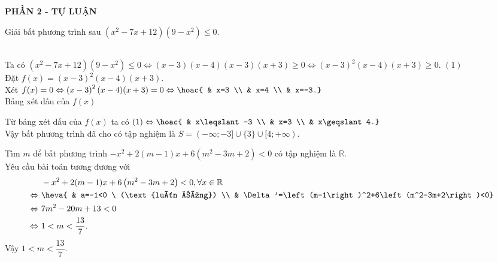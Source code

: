 \begin{center}
	\textbf{PHẦN 2 - TỰ LUẬN}
\end{center}
\begin{bt}%
Giải bất phương trình sau $\left(x^2-7x+12\right)\left(9-x^2\right)\leqslant0$.
\loigiai
{\\
Ta có $\left(x^2-7x+12\right)\left(9-x^2\right)\leqslant0 \Leftrightarrow (x-3)(x-4)(x-3)(x+3)\geqslant0 \Leftrightarrow \left(x-3\right)^2(x-4)(x+3)\geqslant0$. \hfill $(1)$ \\
Đặt $f(x)=\left(x-3\right)^2(x-4)(x+3)$. \\
Xét $f(x)=0 \Leftrightarrow \left(x-3\right)^2(x-4)(x+3)=0 \Leftrightarrow \hoac{ & x=3 \\ & x=4 \\ & x=-3.}$ \\
Bảng xét dấu của $f(x)$
\begin{center}
\end{center}
Từ bảng xét dấu của $f(x)$ ta có $(1) \Leftrightarrow \hoac{ & x\leqslant-3 \\ & x=3 \\ & x\geqslant4.}$ \\
Vậy bất phương trình đã cho có tập nghiệm là $S=(-\infty;-3]\cup\{3\}\cup[4;+\infty)$.
}
\end{bt}

\begin{bt}%
Tìm $m$ để bất phương trình $-x^2+2(m-1)x+6\left(m^2-3m+2\right)<0$ có tập nghiệm là $\mathbb{R}$.
\loigiai
{\\
Yêu cầu bài toán tương đương với
$$\begin{aligned}
& \ -x^2+2(m-1)x+6\left(m^2-3m+2\right)<0, \forall x\in\mathbb{R} \\
\Leftrightarrow & \ \heva{ & a=-1<0 \ (\text{luôn đúng}) \\ & \Delta'=\left(m-1\right)^2+6\left(m^2-3m+2\right)<0} \\
\Leftrightarrow & \ 7m^2-20m+13<0 \\
\Leftrightarrow & \ 1<m<\dfrac{13}{7}.
\end{aligned}$$
Vậy $1<m<\dfrac{13}{7}$.
}
\end{bt}

